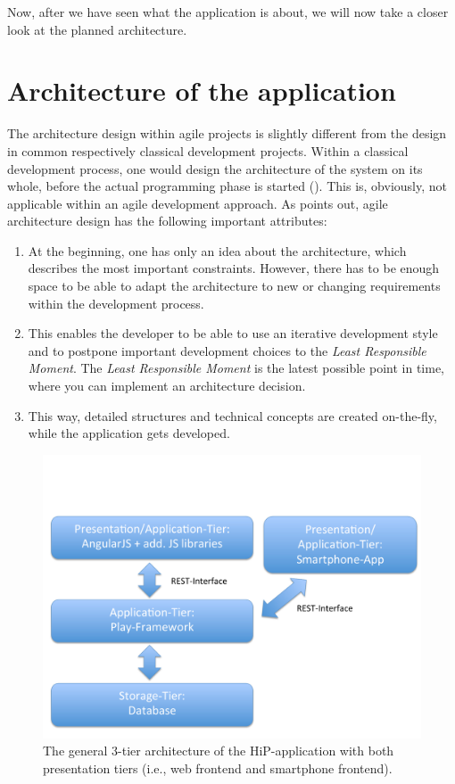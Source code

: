 
Now, after we have seen what the application is about, we will now take a closer look at the planned architecture.

\section{Architecture of the application}
\label{architecture}
The architecture design within agile projects is slightly different from the design in common respectively classical development projects. Within a classical development process, one would design the architecture of the system on its whole, before the actual programming phase is started (\cite{Patterns:2009aa}). This is, obviously, not applicable within an agile development approach. As \cite{Mast2013} points out, agile architecture design has the following important attributes:

\begin{enumerate}
	\item At the beginning, one has only an idea about the architecture, which describes the most important constraints. However, there has to be enough space to be able to adapt the architecture to new or changing requirements within the development process.
	\item This enables the developer to be able to use an iterative development style and to postpone important development choices to the \textit{Least Responsible Moment}. The \textit{Least Responsible Moment} is the latest possible point in time, where you can implement an architecture decision.
	\item This way, detailed structures and technical concepts are created on-the-fly, while the application gets developed.
\end{enumerate}

\begin{figure}[th]
\centerline{\includegraphics[width=1\textwidth]{gfx/architecture}}
\caption{The general 3-tier architecture of the HiP-application with both presentation tiers (i.e., web frontend and smartphone frontend).}
\label{hip:architecture}
\end{figure}

